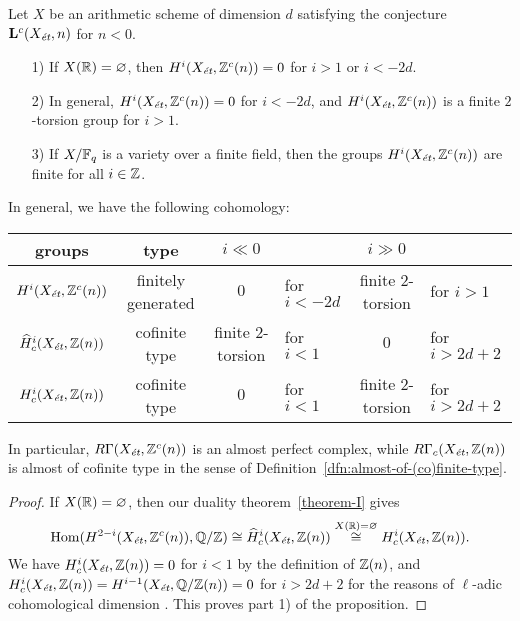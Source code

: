 \documentclass{article}
\numberwithin{equation}{section}
\begin{document}
\begin{proposition}
  \label{prop:motivic-cohomology-duality-consequences}
  Let $X$ be an arithmetic scheme of dimension $d$ satisfying the conjecture
  $\mathbf{L}^c (X_\et,n)$ for $n < 0$.

  \begin{enumerate}
  \item[1)] If $X (\RR) = \emptyset$, then $H^i (X_\et, \ZZ^c (n)) = 0$ for
    $i > 1$ or $i < -2d$.

  \item[2)] In general, $H^i (X_\et, \ZZ^c (n)) = 0$ for $i < -2d$,
    and $H^i (X_\et, \ZZ^c (n))$ is a finite $2$-torsion group for $i > 1$.

  \item[3)] If $X/\FF_q$ is a variety over a finite field, then the groups
    $H^i (X_\et, \ZZ^c(n))$ are finite for all $i \in \ZZ$.
  \end{enumerate}

  In general, we have the following cohomology:
  \begin{center}
    \renewcommand{\arraystretch}{1.5}
    \begin{tabular}{ccclcl}
      \hline
      \textbf{groups} & \textbf{type} & $i \ll 0$ & & $i \gg 0$ \\
      \hline
      $H^i (X_\et, \ZZ^c (n))$ & finitely generated & $0$ & for $i < -2d$ & finite $2$-torsion & for $i > 1$ \\
      $\widehat{H}^i_c (X_\et, \ZZ (n))$ & cofinite type & finite $2$-torsion & for $i < 1$ & $0$ & for $i > 2d + 2$ \\
      $H^i_c (X_\et, \ZZ (n))$ & cofinite type & $0$ & for $i < 1$ & finite $2$-torsion & for $i > 2d + 2$ \\
      \hline
    \end{tabular}
  \end{center}
  In particular, $R\Gamma (X_\et, \ZZ^c (n))$ is an almost perfect complex,
  while $R\Gamma_c (X_\et, \ZZ (n))$ is almost of cofinite type in the sense of
  Definition~\ref{dfn:almost-of-(co)finite-type}.

  \begin{proof}
    If $X (\RR) = \emptyset$, then our duality theorem~\ref{theorem-I} gives
    \[ \Hom (H^{2-i} (X_\et, \ZZ^c (n)), \QQ/\ZZ) \cong
      \widehat{H}^i_c (X_\et, \ZZ (n)) \stackrel{X(\RR)=\emptyset}{\cong}
      H^i_c (X_\et, \ZZ (n)). \]
    We have $H^i_c (X_\et, \ZZ (n)) = 0$ for $i < 1$ by the definition of
    $\ZZ (n)$, and $H^i_c (X_\et, \ZZ (n)) = H^{i-1} (X_\et, \QQ/\ZZ(n)) = 0$
    for $i > 2d + 2$ for the reasons of $\ell$-adic cohomological dimension
    \cite[Exposé~X, Théorème~6.2]{SGA4}. This proves part 1) of the proposition.


\end{proof}
\end{proposition}
\end{document}
